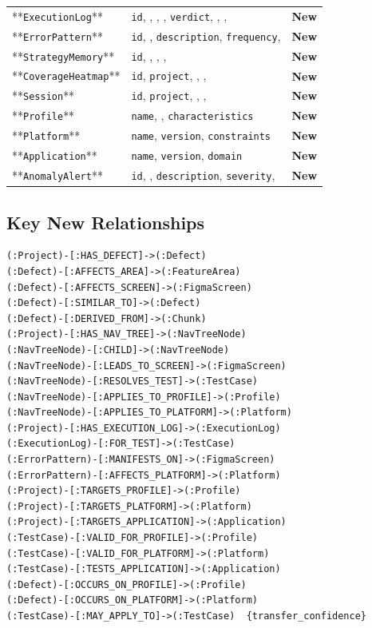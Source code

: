 \begin{tabularx}{\textwidth}{@{}YYY@{}}
**\texttt{ExecutionLog}** & \texttt{id}, , , , \texttt{verdict}, , ,  & \textbf{New} \\
**\texttt{ErrorPattern}** & \texttt{id}, , \texttt{description}, \texttt{frequency},  & \textbf{New} \\
**\texttt{StrategyMemory}** & \texttt{id}, , , ,  & \textbf{New} \\
**\texttt{CoverageHeatmap}** & \texttt{id}, \texttt{project}, , ,  & \textbf{New} \\
**\texttt{Session}** & \texttt{id}, \texttt{project}, , ,  & \textbf{New} \\
**\texttt{Profile}** & \texttt{name}, , \texttt{characteristics} & \textbf{New} \\
**\texttt{Platform}** & \texttt{name}, \texttt{version}, \texttt{constraints} & \textbf{New} \\
**\texttt{Application}** & \texttt{name}, \texttt{version}, \texttt{domain} & \textbf{New} \\
**\texttt{AnomalyAlert}** & \texttt{id}, , \texttt{description}, \texttt{severity},  & \textbf{New} \\
\bottomrule\end{tabularx}\endgroup

\subsection*{Key New Relationships}

\begingroup\scriptsize\begin{verbatim}
(:Project)-[:HAS_DEFECT]->(:Defect)
(:Defect)-[:AFFECTS_AREA]->(:FeatureArea)
(:Defect)-[:AFFECTS_SCREEN]->(:FigmaScreen)
(:Defect)-[:SIMILAR_TO]->(:Defect)
(:Defect)-[:DERIVED_FROM]->(:Chunk)
(:Project)-[:HAS_NAV_TREE]->(:NavTreeNode)
(:NavTreeNode)-[:CHILD]->(:NavTreeNode)
(:NavTreeNode)-[:LEADS_TO_SCREEN]->(:FigmaScreen)
(:NavTreeNode)-[:RESOLVES_TEST]->(:TestCase)
(:NavTreeNode)-[:APPLIES_TO_PROFILE]->(:Profile)
(:NavTreeNode)-[:APPLIES_TO_PLATFORM]->(:Platform)
(:Project)-[:HAS_EXECUTION_LOG]->(:ExecutionLog)
(:ExecutionLog)-[:FOR_TEST]->(:TestCase)
(:ErrorPattern)-[:MANIFESTS_ON]->(:FigmaScreen)
(:ErrorPattern)-[:AFFECTS_PLATFORM]->(:Platform)
(:Project)-[:TARGETS_PROFILE]->(:Profile)
(:Project)-[:TARGETS_PLATFORM]->(:Platform)
(:Project)-[:TARGETS_APPLICATION]->(:Application)
(:TestCase)-[:VALID_FOR_PROFILE]->(:Profile)
(:TestCase)-[:VALID_FOR_PLATFORM]->(:Platform)
(:TestCase)-[:TESTS_APPLICATION]->(:Application)
(:Defect)-[:OCCURS_ON_PROFILE]->(:Profile)
(:Defect)-[:OCCURS_ON_PLATFORM]->(:Platform)
(:TestCase)-[:MAY_APPLY_TO]->(:TestCase)  {transfer_confidence}
\end{verbatim}\endgroup


